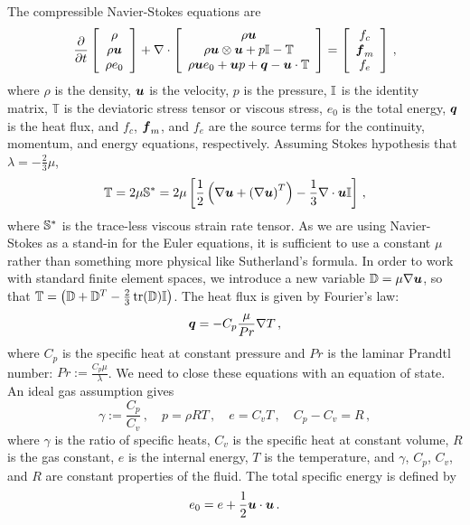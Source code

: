 \documentclass[Dissertation.tex]{subfiles}
\begin{document}
The compressible Navier-Stokes equations are
\begin{align}
\frac{\partial}{\partial t}\left[ \begin{array}{c} \rho\\ \rho\boldsymbol u\\ \rho e_0\\ \end{array} \right]
+\nabla\cdot\left[ \begin{array}{c} \rho\boldsymbol u\\ \rho\boldsymbol u\otimes\boldsymbol u+p\mathbb{I}-\mathbb{T}\\ \rho\boldsymbol u e_0+\boldsymbol u p+\boldsymbol q-\boldsymbol u\cdot\mathbb{T}\\ \end{array} \right]
=\left[ \begin{array}{c} f_c\\ \boldsymbol f_m\\ f_e\\ \end{array} \right]\,,
\end{align}
where $\rho$ is the density, $\boldsymbol u$ is the velocity, $p$ is the pressure, $\mathbb{I}$ is the identity matrix,
$\mathbb{T}$ is the deviatoric stress tensor or viscous stress, $e_0$ is the total energy, $\boldsymbol q$ is the heat flux, 
and $f_c$, $\boldsymbol f_m$, and $f_e$ are the source terms for the continuity, momentum, and energy equations, respectively.
Assuming Stokes hypothesis that $\lambda=-\frac{2}{3}\mu$, 
\begin{equation*}
	\mathbb{T}=2\mu\mathbb{S}^*=2\mu\left[ \frac{1}{2}\left( \nabla\boldsymbol u+\left( \nabla\boldsymbol u \right)^T \right)-\frac{1}{3}\nabla\cdot\boldsymbol u\mathbb{I} \right]\,,
\end{equation*}
where $\mathbb{S}^*$ is the trace-less viscous strain rate tensor.
As we are using Navier-Stokes as a stand-in for the Euler equations, it is sufficient to
use a constant $\mu$ rather than something more physical like Sutherland's formula.
In order to work with standard finite element spaces, we introduce a new variable $\mathbb{D}=\mu\nabla\boldsymbol u$, so that 
$\mathbb{T}=\left( \mathbb{D}+\mathbb{D}^T-\frac{2}{3}\operatorname*{tr}(\mathbb{D})\mathbb{I} \right)$.
The heat flux is given by Fourier's law:
\begin{equation*}
	\boldsymbol q=-C_p\frac{\mu}{Pr}\nabla T\,,
\end{equation*}
where $C_p$ is the specific heat at constant pressure and $Pr$ is the laminar Prandtl number: $Pr:=\frac{C_p\mu}{\lambda}$.
We need to close these equations with an equation of state. An ideal gas assumption gives
\begin{equation*}
	\gamma:=\frac{C_p}{C_v}\,,\quad p=\rho RT\,,\quad e=C_v T\,,\quad C_p-C_v=R\,,
\end{equation*}
where $\gamma$ is the ratio of specific heats, $C_v$ is the specific heat at constant volume, $R$ is the gas constant,
$e$ is the internal energy, $T$ is the temperature,
and $\gamma$, $C_p$, $C_v$, and $R$ are constant properties of the fluid.
The total specific energy is defined by
\begin{equation*}
	e_0=e+\frac{1}{2}\boldsymbol u\cdot\boldsymbol u\,.
\end{equation*}
\end{document}
